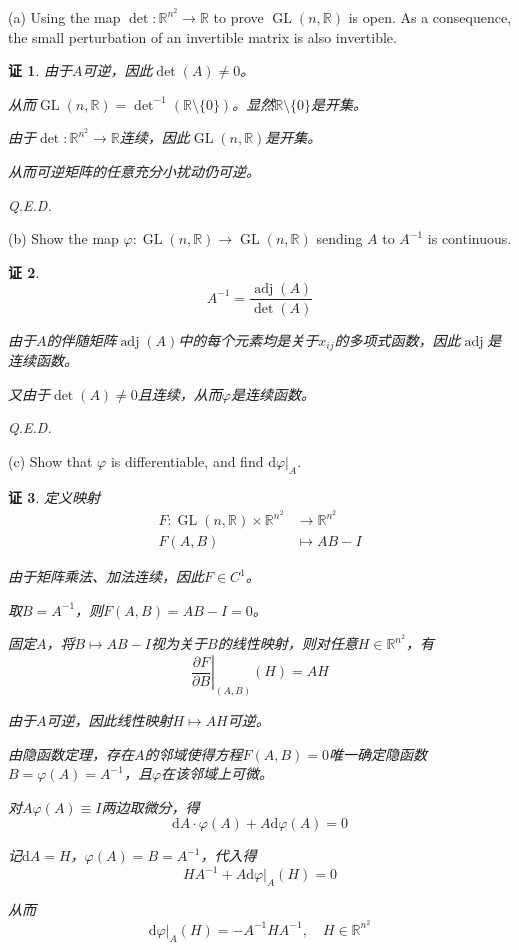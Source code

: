 \documentclass[a4paper,12pt]{article}
\newtheorem*{pf}{证}
\begin{document}
(a) Using the map $\det : \mathbb{R}^{n^2} \to \mathbb{R}$ to prove $\operatorname{GL}(n,\mathbb{R})$ is open. As a consequence, the small perturbation of an invertible matrix is also invertible.
\begin{pf}
    由于$A$可逆，因此$\det(A) \neq 0$。
    
    从而$\operatorname{GL}(n,\mathbb{R}) = \det^{-1}(\mathbb{R} \setminus \{0\})$。显然$\mathbb{R} \setminus \{0\}$是开集。
    
    由于$\det: \mathbb{R}^{n^2} \to \mathbb{R}$连续，因此$\operatorname{GL}(n,\mathbb{R})$是开集。
    
    从而可逆矩阵的任意充分小扰动仍可逆。
    
    Q.E.D.
\end{pf}

(b) Show the map $\varphi : \operatorname{GL}(n,\mathbb{R}) \to \operatorname{GL}(n,\mathbb{R})$ sending $A$ to $A^{-1}$ is continuous.
\begin{pf}
    $$A^{-1} = \frac{\operatorname{adj}(A)}{\det(A)}$$
    
    由于$A$的伴随矩阵$\operatorname{adj}(A)$中的每个元素均是关于$x_{ij}$的多项式函数，因此$\operatorname{adj}$是连续函数。
    
    又由于$\det(A) \neq 0$且连续，从而$\varphi$是连续函数。
    
    Q.E.D.
\end{pf}

(c) Show that $\varphi$ is differentiable, and find $\left. \mathrm{d}\varphi \right|_A$.
\begin{pf}
    定义映射
    \begin{align*}
        F: \operatorname{GL}(n,\mathbb{R}) \times \mathbb{R}^{n^2} &\to \mathbb{R}^{n^2} \\
        F(A, B) &\mapsto AB - I
    \end{align*}
    
    由于矩阵乘法、加法连续，因此$F \in C^1$。
    
    取$B = A^{-1}$，则$F(A, B) = AB - I = 0$。
    
    固定$A$，将$B \mapsto AB - I$视为关于$B$的线性映射，则对任意$H \in \mathbb{R}^{n^2}$，有
    $$\left.\frac{\partial F}{\partial B}\right|_{(A,B)}(H) = AH$$
    
    由于$A$可逆，因此线性映射$H \mapsto AH$可逆。
    
    由隐函数定理，存在$A$的邻域使得方程$F(A,B) = 0$唯一确定隐函数$B = \varphi(A) = A^{-1}$，且$\varphi$在该邻域上可微。
    
    对$A\varphi(A) \equiv I$两边取微分，得
    $$\mathrm{d}A \cdot \varphi(A) + A\mathrm{d}\varphi(A) = 0$$
    
    记$\mathrm{d}A = H$，$\varphi(A) = B = A^{-1}$，代入得
    $$HA^{-1} + A\left.\mathrm{d}\varphi\right|_A(H) = 0$$
    
    从而
    $$\left.\mathrm{d}\varphi\right|_A(H) = -A^{-1}HA^{-1}, \quad H \in \mathbb{R}^{n^2}$$
\end{pf}
\end{document}
